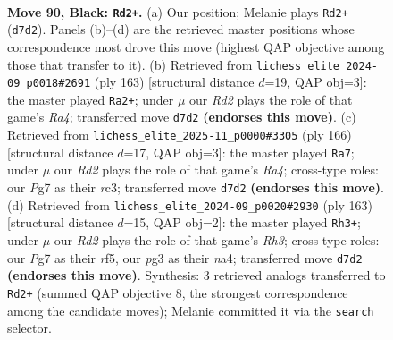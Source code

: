 \documentclass[11pt]{article}
\begin{document}
\clearpage

\begin{figure}[p]\centering
\begin{subfigure}{0.46\textwidth}\centering
\resizebox{\linewidth}{!}{%
\newchessgame
\chessboard[
  setfen={8/3r2p1/5p2/5k1p/7P/6P1/1RN4K/8 b - - 5 90},
  showmover=false,
  pgfstyle=straightmove, color=movearrow, markmove={d7-d2}
]}
\caption{}
\end{subfigure}\hfill
\begin{subfigure}{0.46\textwidth}\centering
\resizebox{\linewidth}{!}{%
\newchessgame
\chessboard[
  setfen={8/8/2R3p1/r4k1p/4p2P/6P1/5K2/8 b - - 27 82},
  showmover=false,
  pgfstyle=straightmove, color=movearrow, markmove={a5-a2}
]}
\caption{}
\end{subfigure}
\\[4pt]
\begin{subfigure}{0.46\textwidth}\centering
\resizebox{\linewidth}{!}{%
\newchessgame
\chessboard[
  setfen={5k2/6p1/7p/7P/R5PK/2r5/8/8 w - - 23 84},
  showmover=false,
  pgfstyle=straightmove, color=movearrow, markmove={a4-a7}
]}
\caption{}
\end{subfigure}\hfill
\begin{subfigure}{0.46\textwidth}\centering
\resizebox{\linewidth}{!}{%
\newchessgame
\chessboard[
  setfen={8/1pk5/p6r/P4R2/N7/1K6/8/8 b - - 4 82},
  showmover=false,
  pgfstyle=straightmove, color=movearrow, markmove={h6-h3}
]}
\caption{}
\end{subfigure}
\caption{\textbf{Move 90, Black: \texttt{Rd2+}.} (a) Our position; Melanie plays \texttt{Rd2+} (\texttt{d7d2}). Panels (b)--(d) are the retrieved master positions whose correspondence most drove this move (highest QAP objective among those that transfer to it). (b) Retrieved from \texttt{lichess\_elite\_2024-09\_p0018\#2691} (ply 163) [structural distance $d$=19, QAP obj=3]: the master played \texttt{Ra2+}; under $\mu$ our \emph{Rd2} plays the role of that game's \emph{Ra4}; transferred move \texttt{d7d2} \textbf{(endorses this move)}. (c) Retrieved from \texttt{lichess\_elite\_2025-11\_p0000\#3305} (ply 166) [structural distance $d$=17, QAP obj=3]: the master played \texttt{Ra7}; under $\mu$ our \emph{Rd2} plays the role of that game's \emph{Ra4}; cross-type roles: our \emph{P}g7 as their \emph{r}c3; transferred move \texttt{d7d2} \textbf{(endorses this move)}. (d) Retrieved from \texttt{lichess\_elite\_2024-09\_p0020\#2930} (ply 163) [structural distance $d$=15, QAP obj=2]: the master played \texttt{Rh3+}; under $\mu$ our \emph{Rd2} plays the role of that game's \emph{Rh3}; cross-type roles: our \emph{P}g7 as their \emph{r}f5, our \emph{p}g3 as their \emph{n}a4; transferred move \texttt{d7d2} \textbf{(endorses this move)}. Synthesis: 3 retrieved analogs transferred to \texttt{Rd2+} (summed QAP objective 8, the strongest correspondence among the candidate moves); Melanie committed it via the \texttt{search} selector.}
\label{fig:thought-m179}
\end{figure}
\end{document}
